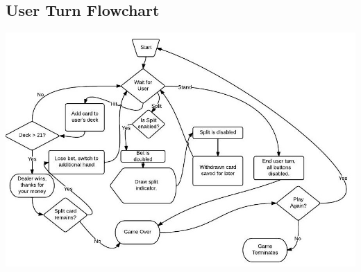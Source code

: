 \documentclass{article}
\begin{document}
\subsection{User Turn Flowchart}
\includegraphics[width=\textwidth]{UserTurnFlowchart}
\end{document}
